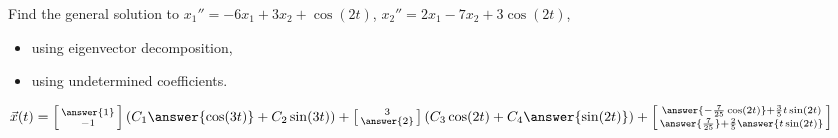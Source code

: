 \documentclass{ximera}
\begin{document}
\begin{exercise}
    Find the general solution to $x_1'' = -6x_1+ 3x_2 + \cos (2t)$, $x_2'' = 2x_1 -7x_2 + 3\cos (2t)$,
    \begin{itemize}
        \item using eigenvector decomposition,
        \item using undetermined coefficients.
    \end{itemize}
    $\vec{x}(t) = \left[\begin{smallmatrix} \answer{1} \\ -1 \end{smallmatrix}\right](C_1\answer{\cos(3t)} + C_2\sin(3t)) + \left[\begin{smallmatrix} 3 \\ \answer{2} \end{smallmatrix}\right](C_3\cos(2t) + C_4\answer{\sin(2t)}) + \left[\begin{smallmatrix} \answer{-\frac{7}{25}\cos(2t)} + \frac{3}{5}t\sin(2t) \\ \answer{\frac{7}{25}} + \frac{2}{5}\answer{t\sin(2t)} \end{smallmatrix}\right]$
\end{exercise}
\end{document}
